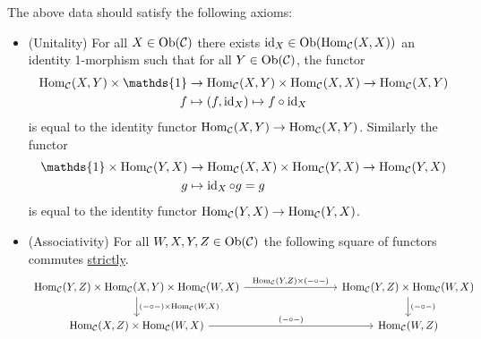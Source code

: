 \begin{defi}
The above data should satisfy the following axioms:
\begin{itemize}
	\item 
	(Unitality) 
	For all $ X \in \operatorname{Ob} ( \mathcal{ C } ) $ there exists $ \operatorname{id}_X \in \operatorname{Ob} ( \operatorname{Hom}_{ \mathcal{C } } ( X, X ))$ an identity 1-morphism such that for all $ Y \in \operatorname{Ob}( \mathcal{ C } ) $, the functor 
	\begin{align*}
		\Hom_{ \mathcal{ C } } ( X , Y ) \times \mathds{ 1 } &\to \Hom_{ \mathcal{ C } } ( X , Y ) \times \Hom_{ \mathcal{ C } } ( X , X ) \to \Hom_{ \mathcal{C } } ( X, Y )
		\\
		f &\mapsto (f, \id_X ) \mapsto f \circ \id_X
	\end{align*}
is equal to the identity functor $ \operatorname{Hom}_{ \mathcal{ C } } ( X , Y ) \to \operatorname{Hom}_{ \mathcal{ C }  } ( X, Y )$.
Similarly the functor
	\begin{align*}
		\mathds{ 1 } \times \Hom_{ \mathcal{ C } } ( Y , X ) &\to \Hom_{ \mathcal{ C } } ( X , X ) \times \Hom_{ \mathcal{ C } } ( Y , X ) \to \Hom_{ \mathcal{C } } ( Y, X )
		\\
		g &\mapsto \id_X \circ g = g
	\end{align*}
is equal to the identity functor $ \operatorname{Hom}_{ \mathcal{ C } } ( Y , X ) \to \operatorname{Hom}_{ \mathcal{ C }  }(  Y , X )$.

	\item 
	(Associativity) 
	For all $ W , X , Y , Z \in \operatorname{Ob} ( \mathcal{ C } ) $ the following square of functors commutes \underline{strictly}.
	\[
	\begin{tikzcd}[column sep= 3cm]
		\Hom_{ \mathcal{ C } } ( Y , Z ) \times \Hom_{ \mathcal{ C } } ( X , Y ) \times \Hom_{ \mathcal{ C } } ( W , X )
		\ar[r, " { \Hom_{ \mathcal{ C } } ( Y , Z ) \times ( - \circ - ) } "]
		\ar[d, " { ( - \circ - ) \times \Hom_{ \mathcal{ C } } ( W , X ) } "]
		&
		\Hom_{\mathcal{ C } } ( Y , Z ) \times \Hom_{ \mathcal{ C } } ( W , X )
		\ar[d, " { ( - \circ - ) } "]
		\\
		\Hom_{ \mathcal{ C } } ( X , Z ) \times \Hom_{\mathcal{ C } } ( W , X )
		\ar[r, " { ( - \circ -) } "]
		&
		\Hom_{ \mathcal{ C } }  ( W , Z )
	\end{tikzcd}
	\]
\end{itemize}
\end{defi}

